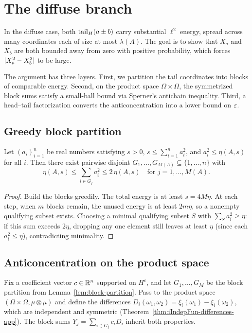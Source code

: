 \section{The diffuse branch}\label{sec:blocks}

In the diffuse case, both $\operatorname{tail}_H(a \pm b)$ carry substantial $\ell^2$
energy, spread across many coordinates each of size at most $\lambda(A)$.
The goal is to show that $X_a$ and $X_b$ are both bounded away from zero
with positive probability, which forces
$\lvert X_a^2 - X_b^2 \rvert$ to be large.

The argument has three layers. First, we partition the tail coordinates into
blocks of comparable energy. Second, on the product space
$\Omega \times \Omega$, the symmetrized block sums satisfy a small-ball
bound via Sperner's antichain inequality. Third, a head--tail factorization
converts the anticoncentration into a lower bound on $\varepsilon$.

\subsection{Greedy block partition}

\begin{lemma}\label{lem:block-partition}
Let $(a_i)_{i=1}^n$ be real numbers satisfying $s > 0$,
$s \le \sum_{i=1}^n a_i^2$, and $a_i^2 \le \eta(A,s)$ for all $i$.
Then there exist pairwise disjoint
$G_1, \dots, G_{M(A)} \subseteq \{1, \dots, n\}$ with
\[
\eta(A,s) \le \sum_{i \in G_j} a_i^2 \le 2\,\eta(A,s)
\quad \text{for } j = 1, \dots, M(A).
\]
\end{lemma}

\begin{proof}
Build the blocks greedily. The total energy is at least
$s = 4M\eta$. At each step, when $m$ blocks remain, the unused energy
is at least $2m\eta$, so a nonempty qualifying subset exists. Choosing a
minimal qualifying subset $S$ with $\sum_{S} a_i^2 \ge \eta$: if this
sum exceeds $2\eta$, dropping any one element still leaves at least
$\eta$ (since each $a_i^2 \le \eta$), contradicting minimality.
\end{proof}

\subsection{Anticoncentration on the product space}%
\label{sec:finite-conc}

Fix a coefficient vector $c \in \mathbb{R}^n$ supported on $H^c$, and let
$G_1, \dots, G_M$ be the block partition from
Lemma~\ref{lem:block-partition}.
Pass to the product space $(\Omega \times \Omega, \mu \otimes \mu)$ and
define the differences
$D_i(\omega_1, \omega_2)
= \xi_i(\omega_1) - \xi_i(\omega_2)$,
which are independent and symmetric
(Theorem~\ref{thm:iIndepFun-differences-app}). The block sums
$Y_j = \sum_{i \in G_j} c_i D_i$ inherit both properties.

